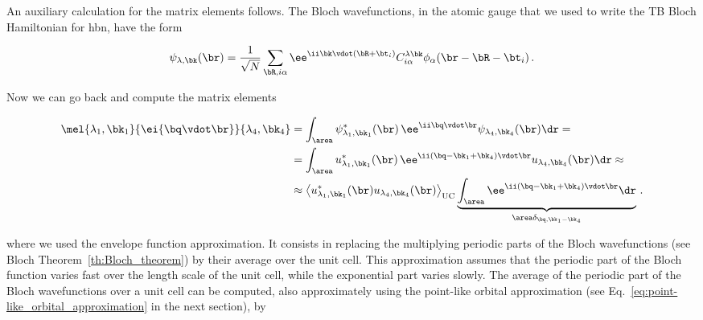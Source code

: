 \noindent An auxiliary calculation for the matrix elements follows.
The Bloch wavefunctions, in the atomic gauge that we used to write the TB Bloch Hamiltonian for \gls{hbn}, have the form

\begin{equation}
    \psi_{\lambda, \bk}(\br)=\frac{1}{\sqrt{N}}\sum_{\bR,i\alpha}\ee^{\ii\bk\vdot(\bR+\bt_{i})}C_{i\alpha}^{\lambda \bk}\phi_{\alpha}(\br-\bR-\bt_{i})\,.
\end{equation}

\noindent Now we can go back and compute the matrix elements

\begin{equation}
    \begin{split}
        \mel{\lambda_1, \bk_1}{\ei{\bq \vdot \br}}{\lambda_4, \bk_4} &= \int_{\area} \psi_{\lambda_{1}, \bk_{1}}^{*}(\br)\,\ee^{\ii \bq \vdot \br}\psi_{\lambda_4, \bk_4}(\br) \dr = \\
        & = \int_{\area} u_{\lambda_1, \bk_1}^{*}(\br)\,\ee^{\ii(\bq-\bk_{1}+\bk_{4})\vdot\br} u_{\lambda_4, \bk_4}(\br) \dr \approx \\
        & \approx \left \langle u_{\lambda_1, \bk_1}^{*}(\br) u_{\lambda_4, \bk_4}(\br) \right\rangle_{\mathrm{UC}} \underbrace{\int_{\area} \ee^{\ii(\bq-\bk_{1}+\bk_{4})\vdot\br} \dr }_{\area \delta_{\bq,\bk_{1}-\bk_{4}}} \,.
    \end{split}
\end{equation}

\noindent where we used the envelope function approximation.
It consists in replacing the multiplying periodic parts of the Bloch wavefunctions (see Bloch Theorem~\ref{th:Bloch_theorem}) by their average over the unit cell.
This approximation assumes that the periodic part of the Bloch function varies fast over the length scale of the unit cell, while the exponential part varies slowly.
The average of the periodic part of the Bloch wavefunctions over a unit cell can be computed, also approximately using the point-like orbital approximation (see Eq.~\eqref{eq:point-like_orbital_approximation} in the next section), by

